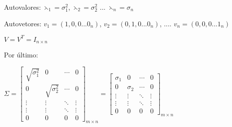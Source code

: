 \documentclass[leqno]{article}
\numberwithin{equation}{section}
\begin{document}
\begin{enumerate}
\begin{sol}
		Autovalores: $\leftthreetimes_1 = \sigma_1^2$, $\leftthreetimes_2 = \sigma_2^2$ ... $\leftthreetimes_n = \sigma_n$
		
		Autovetores: $v_1 = (1, 0, 0 ... 0_n)$, $v_2 = (0, 1, 0 ... 0_n)$, .... $v_n = (0, 0, 0 ... 1_n)$
		
		$V = V^T = I_{n \times n}$
		
		Por último:
		
		$\Sigma = \begin{bmatrix}
			\sqrt{\sigma_1^2} & 0 & \cdots & 0\\
			0 & \sqrt{\sigma_2^2} & \cdots & 0\\
			\vdots & \vdots & \ddots & \vdots\\
			\vdots & \vdots & \ddots & \vdots\\
			0 & 0 & 0 & 0
		\end{bmatrix}_{m \times n} = \begin{bmatrix}
		\sigma_1 & 0 & \cdots & 0\\
		0 & \sigma_2 & \cdots & 0\\
		\vdots & \vdots & \ddots & \vdots\\
		\vdots & \vdots & \ddots & \vdots\\
		0 & 0 & 0 & 0
		\end{bmatrix}_{m \times n}$
			
		\end{sol} 
		
	\end{enumerate}
\end{document}
